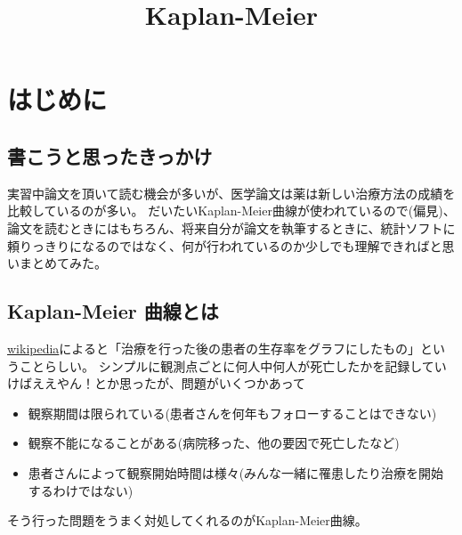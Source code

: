 \documentclass[11pt]{article}
\title{Kaplan-Meier}
\providecommand{\tightlist}{%
      \setlength{\itemsep}{0pt}\setlength{\parskip}{0pt}}
\begin{document}
    
    
    \maketitle
    
    

    
    \hypertarget{ux306fux3058ux3081ux306b}{%
\section{はじめに}\label{ux306fux3058ux3081ux306b}}

    \hypertarget{ux66f8ux3053ux3046ux3068ux601dux3063ux305fux304dux3063ux304bux3051}{%
\subsection{書こうと思ったきっかけ}\label{ux66f8ux3053ux3046ux3068ux601dux3063ux305fux304dux3063ux304bux3051}}

    実習中論文を頂いて読む機会が多いが、医学論文は薬は新しい治療方法の成績を比較しているのが多い。
だいたいKaplan-Meier曲線が使われているので(偏見)、論文を読むときにはもちろん、将来自分が論文を執筆するときに、統計ソフトに頼りっきりになるのではなく、何が行われているのか少しでも理解できればと思いまとめてみた。

    \hypertarget{kaplan-meier-ux66f2ux7ddaux3068ux306f}{%
\subsection{Kaplan-Meier
曲線とは}\label{kaplan-meier-ux66f2ux7ddaux3068ux306f}}

    \href{https://ja.wikipedia.org/wiki/\%E7\%94\%9F\%E5\%AD\%98\%E7\%8E\%87\%E6\%9B\%B2\%E7\%B7\%9A}{wikipedia}によると「治療を行った後の患者の生存率をグラフにしたもの」ということらしい。
シンプルに観測点ごとに何人中何人が死亡したかを記録していけばええやん！とか思ったが、問題がいくつかあって

\begin{itemize}
\tightlist
\item
  観察期間は限られている(患者さんを何年もフォローすることはできない)
\item
  観察不能になることがある(病院移った、他の要因で死亡したなど)
\item
  患者さんによって観察開始時間は様々(みんな一緒に罹患したり治療を開始するわけではない)
\end{itemize}

そう行った問題をうまく対処してくれるのがKaplan-Meier曲線。
\end{document}

